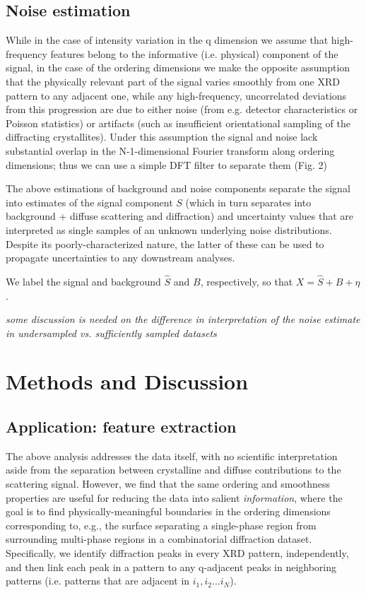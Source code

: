 \documentclass[12pt]{iopart}
\begin{document}
\subsection{Noise estimation}
While in the case of intensity variation in the q dimension we assume
that high-frequency features belong to the informative (i.e. physical)
component of the signal, in the case of the ordering dimensions we
make the opposite assumption that the physically relevant part of the
signal varies smoothly from one XRD pattern to any adjacent one, while
any high-frequency, uncorrelated deviations from this progression are
due to either noise (from e.g. detector characteristics or Poisson
statistics) or artifacts (such as insufficient orientational sampling
of the diffracting crystallites). Under this assumption the signal and
noise lack substantial overlap in the N-1-dimensional Fourier transform
along ordering dimensions; thus we can use a simple DFT filter to
separate them (Fig. 2)

The above estimations of background and noise components separate
the signal into estimates of the signal component $S$ (which in turn separates into
background + diffuse scattering and diffraction) and uncertainty values
that are interpreted as single samples of an unknown underlying noise
distributions. Despite its poorly-characterized nature, the latter of
these can be used to propagate uncertainties to any downstream analyses.

We label the signal and background $\hat{S}$ and $B$, respectively,
so that $X = \hat{S} + B + \eta$.

\emph{some discussion is needed on the difference in interpretation of the noise estimate in undersampled vs. sufficiently sampled datasets}

\section{Methods and Discussion}
\subsection{Application: feature extraction}
The above analysis addresses the data itself, with no scientific
interpretation aside from the separation between crystalline and diffuse
contributions to the scattering signal. However, we find that the same
ordering and smoothness properties are useful for reducing the data into
salient \emph{information}, where the goal is to find physically-meaningful
boundaries in the ordering dimensions corresponding to, e.g., the
surface separating a single-phase region from surrounding multi-phase
regions in a combinatorial diffraction dataset. Specifically, we 
identify diffraction peaks in every XRD pattern, independently, and then
link each peak in a pattern to any q-adjacent peaks in neighboring patterns (i.e. patterns that are adjacent in $i_1, i_2 ... i_N$). 
\end{document}
